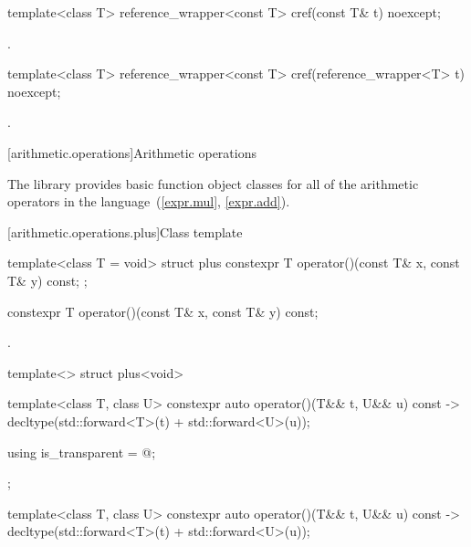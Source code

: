 %
\begin{itemdecl}
template<class T> reference_wrapper<const T> cref(const T& t) noexcept;
\end{itemdecl}

\begin{itemdescr}
\pnum\returns {}.
\end{itemdescr}

%
\begin{itemdecl}
template<class T> reference_wrapper<const T> cref(reference_wrapper<T> t) noexcept;
\end{itemdecl}

\begin{itemdescr}
\pnum\returns {}.
\end{itemdescr}

[arithmetic.operations]{Arithmetic operations}

\pnum
The library provides basic function object classes for all of the arithmetic
operators in the language~(\ref{expr.mul}, \ref{expr.add}).

[arithmetic.operations.plus]{Class template }

%
\begin{itemdecl}
template<class T = void> struct plus {
  constexpr T operator()(const T& x, const T& y) const;
};
\end{itemdecl}

%
\begin{itemdecl}
constexpr T operator()(const T& x, const T& y) const;
\end{itemdecl}

\begin{itemdescr}
\pnum\returns {}.
\end{itemdescr}

%
\begin{itemdecl}
template<> struct plus<void> {
  template<class T, class U> constexpr auto operator()(T&& t, U&& u) const
    -> decltype(std::forward<T>(t) + std::forward<U>(u));

  using is_transparent = @\unspec@;
};
\end{itemdecl}

%
\begin{itemdecl}
template<class T, class U> constexpr auto operator()(T&& t, U&& u) const
    -> decltype(std::forward<T>(t) + std::forward<U>(u));
\end{itemdecl}

